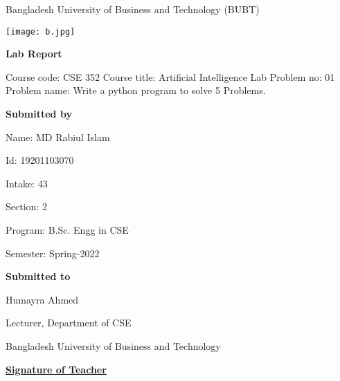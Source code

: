 \documentclass[a4paper]{article}
\begin{document}
\begin{center}
\huge {Bangladesh University of Business and Technology (BUBT)}

   \texttt{[image: b.jpg]}
   
   
   \textbf{Lab Report}
\end{center}
\vspace{8mm}
\begin{enumerate}
  \large{
  Course code: CSE 352
  \newline
  Course title: Artificial Intelligence Lab
  \newline
  Problem no: 01
  \newline
  Problem name: Write a python program to solve 5 Problems.
  } 
\end{enumerate}



\vspace{8mm}

\begin{tcolorbox}[colback=white,colframe=black,center,width=90mm]
  \textbf{Submitted by}
  \newline
  
  Name: MD Rabiul Islam
  
  Id:   19201103070
  
  Intake:  43
  
  Section: 2
  
  Program: B.Sc. Engg in CSE
  
  Semester: Spring-2022
\end{tcolorbox}
\vspace{5mm}

\begin{tcolorbox}[colback=white,colframe=black,center,width=90mm]
 \textbf{Submitted to}
 \newline
  
  Humayra Ahmed
  
  Lecturer, Department of CSE
  
  Bangladesh University of Business and Technology
  
\end{tcolorbox}
\vspace{30mm}
\underline{\textbf{Signature of Teacher}}
\textbf{}
\end{document}
